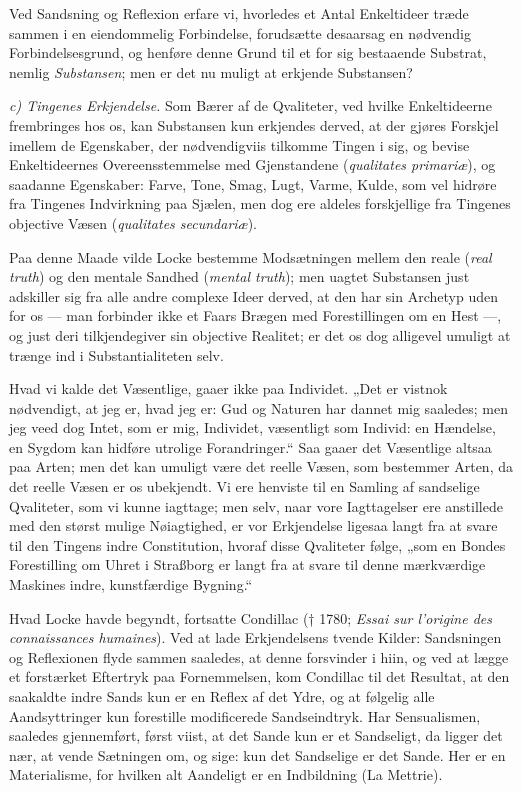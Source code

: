 \documentclass[12pt]{book}
\newcommand{\opage}[1]{\marginnote{\footnotesize\textit{[#1]}}}
\begin{document}
Ved Sandsning og Reflexion erfare vi, hvorledes et Antal Enkeltideer træde sammen i
en eiendommelig Forbindelse, forudsætte desaarsag en nødvendig Forbindelsesgrund,
og henføre denne Grund til et for sig bestaaende Substrat, nemlig \emph{Substansen};
men er det nu muligt at erkjende Substansen?

\emph{c) Tingenes Erkjendelse.} Som Bærer af de Qvaliteter, ved hvilke
Enkeltideerne frembringes hos os, kan Substansen kun erkjendes derved, at der gjøres
Forskjel imellem de Egenskaber, der nødvendigviis tilkomme Tingen i sig, og bevise
Enkeltideernes Overeensstemmelse med Gjenstandene (\textit{qualitates primariæ}), og
saadanne Egenskaber: Farve, Tone, Smag, Lugt, Varme, Kulde, som vel hidrøre fra
Tingenes Indvirkning paa Sjælen, men dog ere aldeles forskjellige fra Tingenes
objective Væsen (\textit{qualitates secundariæ}).

Paa denne Maade vilde Locke bestemme Modsætningen mellem den reale (\textit{real
truth}) og den mentale Sandhed (\textit{mental truth}); men uagtet Substansen just
adskiller sig fra alle andre complexe Ideer derved, at den har sin Archetyp uden for
os --- man forbinder ikke et Faars Brægen med Forestillingen om en Hest ---, og just
deri tilkjendegiver sin objective Realitet; er det os dog alligevel umuligt at
trænge ind i Substantialiteten selv.

\opage{14} Hvad vi kalde det Væsentlige, gaaer ikke paa Individet. „Det er vistnok nødvendigt,
at jeg er, hvad jeg er: Gud og Naturen har dannet mig saaledes; men jeg veed dog
Intet, som er mig, Individet, væsentligt som Individ: en Hændelse, en Sygdom kan
hidføre utrolige Forandringer.“ Saa gaaer det Væsentlige altsaa paa Arten; men det
kan umuligt være det reelle Væsen, som bestemmer Arten, da det reelle Væsen er os
ubekjendt. Vi ere henviste til en Samling af sandselige Qvaliteter, som vi kunne
iagttage; men selv, naar vore Iagttagelser ere anstillede med den størst mulige
Nøiagtighed, er vor Erkjendelse ligesaa langt fra at svare til den Tingens indre
Constitution, hvoraf disse Qvaliteter følge, „som en Bondes Forestilling om Uhret i
Straßborg er langt fra at svare til denne mærkværdige Maskines indre, kunstfærdige
Bygning.“

Hvad Locke havde begyndt, fortsatte Condillac († 1780; \textit{Essai sur l'origine
des connaissances humaines}). Ved at lade Erkjendelsens tvende Kilder: Sandsningen
og Reflexionen flyde sammen saaledes, at denne forsvinder i hiin, og ved at lægge et
forstærket Eftertryk paa Fornemmelsen, kom Condillac til det Resultat, at den
saakaldte indre Sands kun er en Reflex af det Ydre, og at følgelig alle
Aandsyttringer kun forestille modificerede Sandseindtryk. Har Sensualismen, saaledes
gjennemført, først viist, at det Sande kun er et Sandseligt, da ligger det nær, at
vende Sætningen om, og sige: kun det Sandselige er det Sande. Her er en
Materialisme, for hvilken alt Aandeligt er en Indbildning (La Mettrie).
\end{document}
